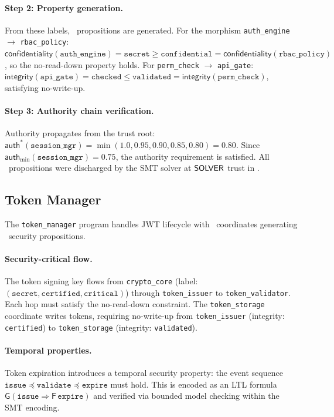 \documentclass[11pt]{article}
\newcommand{\AuthLevel}{\mathsf{auth}}
\newcommand{\Confid}{\mathsf{confidentiality}}
\newcommand{\Integrity}{\mathsf{integrity}}
\begin{document}
\paragraph{Step 2: Property generation.}
From these labels, \ppLXIXsecaccesscontrolProps\ propositions are
generated.  For the morphism \texttt{auth\_engine} $\to$
\texttt{rbac\_policy}: $\Confid(\texttt{auth\_engine}) =
\texttt{secret} \geq \texttt{confidential} =
\Confid(\texttt{rbac\_policy})$, so the no-read-down property holds.
For \texttt{perm\_check} $\to$ \texttt{api\_gate}:
$\Integrity(\texttt{api\_gate}) = \texttt{checked} \leq
\texttt{validated} = \Integrity(\texttt{perm\_check})$, satisfying
no-write-up.

\paragraph{Step 3: Authority chain verification.}
Authority propagates from the trust root:
$\AuthLevel^*(\texttt{session\_mgr}) = \min(1.0, 0.95, 0.90, 0.85,
0.80) = 0.80$.  Since $\AuthLevel_{\min}(\texttt{session\_mgr}) =
0.75$, the authority requirement is satisfied.  All
\ppLXIXsecaccesscontrolProps\ propositions were discharged by the SMT
solver at $\mathsf{SOLVER}$ trust in \ppLXIXsecaccesscontrolTime.


\subsection{Token Manager}\label{sec:ex-token}

The \texttt{token\_manager} program handles JWT lifecycle with
\ppLXIXsectokenmanagerCoords\ coordinates generating
\ppLXIXsectokenmanagerProps\ security propositions.

\paragraph{Security-critical flow.}
The token signing key flows from \texttt{crypto\_core} (label:
$(\texttt{secret}, \texttt{certified}, \texttt{critical})$) through
\texttt{token\_issuer} to \texttt{token\_validator}.  Each hop must
satisfy the no-read-down constraint.  The \texttt{token\_storage}
coordinate writes tokens, requiring no-write-up from
\texttt{token\_issuer} (integrity: \texttt{certified}) to
\texttt{token\_storage} (integrity: \texttt{validated}).

\paragraph{Temporal properties.}
Token expiration introduces a temporal security property: the event
sequence $\texttt{issue} \preceq \texttt{validate} \preceq
\texttt{expire}$ must hold.  This is encoded as an LTL formula
$\mathsf{G}(\texttt{issue} \Rightarrow \mathsf{F}\,\texttt{expire})$
and verified via bounded model checking within the SMT encoding.
\end{document}
